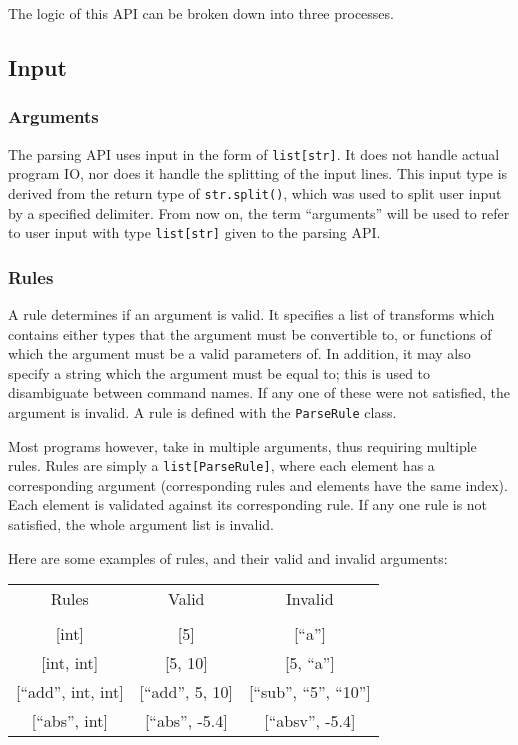 \documentclass{article}
\begin{document}
		The logic of this API can be broken down into three processes.

		\subsection{Input}
			\subsubsection{Arguments}
				The parsing API uses input in the form of \verb|list[str]|. It does not handle
				actual program IO, nor does it handle the splitting of the input lines. This
				input type is derived from the return type of \verb|str.split()|, which was
				used to split user input by a specified delimiter. From now on, the term
				``arguments'' will be used to refer to user input with type \verb|list[str]|
				given to the parsing API\@.

			\subsubsection{Rules}
				A rule determines if an argument is valid. It specifies a list of transforms which
				contains either types that the argument must be convertible to, or functions of
				which the argument must be a valid parameters of. In addition, it may also specify
				a string which the argument must be equal to; this is used to disambiguate between
				command names. If any one of these were not satisfied, the argument is invalid. A
				rule is defined with the \verb|ParseRule| class.

				Most programs however, take in multiple arguments, thus requiring multiple rules.
				Rules are simply a \verb|list[ParseRule]|, where each element has a corresponding
				argument (corresponding rules and elements have the same index). Each element is
				validated against its corresponding rule. If any one rule is not satisfied, the
				whole argument list is invalid.

				Here are some examples of rules, and their valid and invalid arguments:

				\begin{center}
					\begin{tabular}{c c c}
						Rules & Valid & Invalid \\
						\\
						{[int]} & {[5]} & {[``a'']} \\
						{[int, int]} & {[5, 10]} & {[5, ``a'']} \\
						{[``add'', int, int]} & {[``add'', 5, 10]} & {[``sub'', ``5'', ``10'']} \\
						{[``abs'', int]} & {[``abs'', -5.4]} & {[``absv'', -5.4]} \\
					\end{tabular}
				\end{center}
\end{document}
